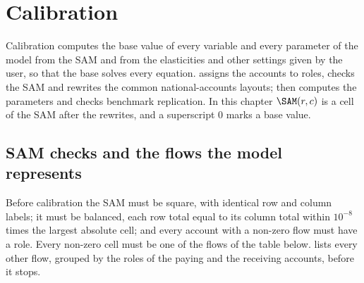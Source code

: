 \chapter{Calibration}\label{chap:calibration}

Calibration computes the base value of every variable and every parameter of
the model from the SAM and from the elasticities and other settings given by
the user, so that the base solves every equation.  assigns
the accounts to roles, checks the SAM and rewrites the common
national-accounts layouts;  then computes the
parameters and checks benchmark replication. In this chapter $\SAM(r, c)$ is
a cell of the SAM after the rewrites, and a superscript $0$ marks a base value.

\section{SAM checks and the flows the model represents}\label{sec:flows}

Before calibration the SAM must be square, with identical row and column
labels; it must be balanced, each row total equal to its column total within
$10^{-8}$ times the largest absolute cell; and every account with a non-zero
flow must have a role. Every non-zero cell must be one of the flows of the
table below.  lists every other flow, grouped by the roles of
the paying and the receiving accounts, before it stops.

